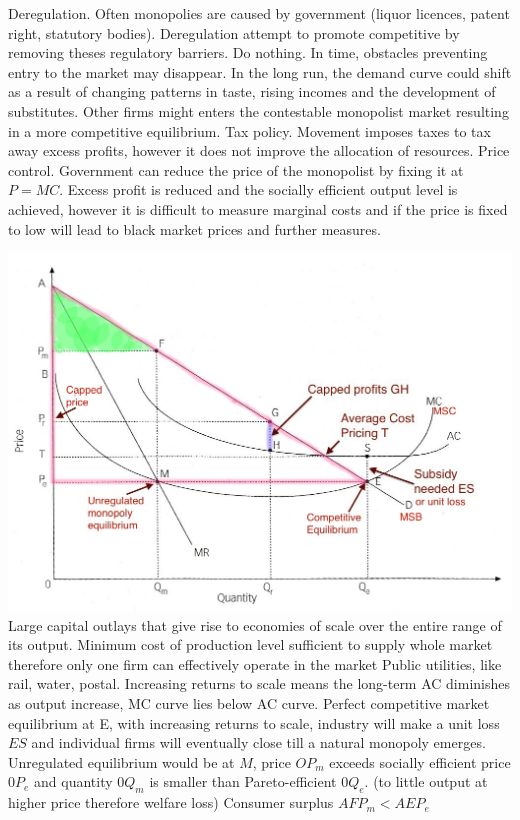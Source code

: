 \documentclass[12pt]{examnotes}
\begin{document}
 Deregulation. Often monopolies are caused by government (liquor licences, patent right,  statutory bodies). Deregulation attempt to promote competitive by removing theses regulatory barriers.
 Do nothing. In time, obstacles preventing entry to the market may disappear. In the long run, the demand curve could shift as a result of changing patterns in taste, rising incomes and the development of substitutes. Other firms might enters the contestable monopolist market resulting in a more competitive equilibrium.
 Tax policy. Movement imposes taxes to tax away excess profits, however it does not improve the allocation of resources. 
 Price control. Government can reduce the price of the monopolist by fixing it at $P=MC$. Excess profit is reduced and the socially efficient output level is achieved, however it is difficult to measure marginal costs and if the price is fixed to low will lead to black market prices and further measures.

\includegraphics[scale=0.35]{./imgs/43.jpg}
\ra Large capital outlays that give rise to economies of scale over the entire range of its output.
\ra Minimum cost of production level sufficient to supply whole market therefore only one firm can effectively operate in the market
\ra Public utilities, like rail, water, postal.
\ra Increasing returns to scale means the long-term AC diminishes as output increase, MC curve lies below AC curve.
\ra Perfect competitive market equilibrium at E, with increasing returns to scale, industry will make a unit loss $ES$ and individual firms will eventually close till a natural monopoly emerges.
\ra Unregulated equilibrium would be at $M$, price $OP_m$ exceeds socially efficient price $0P_e$ and quantity $0Q_m$ is smaller than Pareto-efficient $0Q_e$. (to little output at higher price therefore welfare loss)
\ra Consumer surplus $AFP_m < AEP_e$
\end{document}
